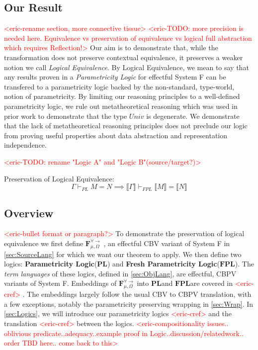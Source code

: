 \documentclass[acmsmall]{acmart}
\newcommand{\den}[1]{\llbracket #1\rrbracket}
\newcommand{\eric}[1]{\textcolor{red}{ <eric-#1> }}
\newcommand{\source}{$\mathbf{F}_{\mu,\Omega}^{\forall\to}\;$}
\newcommand{\pl}{$\mathbf{PL}$}
\newcommand{\fpl}{$\mathbf{FPL}$}
\begin{document}
\subsection{Our Result}
\eric{rename section, more connective tissue}
\eric{TODO: more precision is needed here. Equivalence vs preservation of equivalence vs logical full abstraction which requires Reflection!}
Our aim is to demonstrate that, while the transformation does not preserve contextual equivalence, it preserves a weaker notion we call \textit{Logical Equivalence}. By Logical Equivalence, we mean to say that any results proven in a \textit{Parametricity Logic}\cite{APL}\cite{LAPL}\cite{PE} for effectful System F can be transfered to a parametricity logic backed by the non-standard, type-world, notion of parametricity. By limiting our reasoning principles to a well-defined parametricity logic, we rule out metatheoretical reasoning which was used in prior work\cite{TwoParamVSThreeUniv} to demonstrate that the type $Univ$ is degenerate. We demonstrate that the lack of metatheoretical reasoning principles does not preclude our logic from proving useful properties about data abstraction and representation independence.

\eric{TODO: rename "Logic A" and "Logic B"(source/target?)}
\begin{theorem}
  Preservation of Logical Equivalence:
  $$\Gamma \vdash_{PL} M = N \implies \den{\Gamma} \vdash_{FPL} \den{M} = \den{N}$$
\end{theorem}



\subsection{Overview}

\eric{bullet format or paragraph?}
 To demonstrate the preservation of logical equivalence we first define \source, an effectful CBV variant of System F in \cref{sec:SourceLang} for which we want our theorem to apply. We then define two logics: \textbf{Parametricity Logic}(\pl) and \textbf{Fresh Parametricity Logic}(\fpl). The \textit{term languages} of these logics, defined in \cref{sec:ObjLang}, are effectful, CBPV \cite{CBPV} variants of System F. Embeddings of \source into \pl and \fpl are covered in \eric{cref}. The embeddings largely follow the usual\cite{CBPV} CBV to CBPV translation, with a few exceptions, notably the parametricity preserving wrapping in \cref{sec:Wrap}. In \cref{sec:Logics}, we will introduce our parametricity logics\eric{cref} and the translation \eric{cref} between the logics.
 \eric{compositionality issues.. oblivious predicate..adequacy..example proof in Logic..discussion/relatedwork.. order TBD here.. come back to this}
\end{document}

